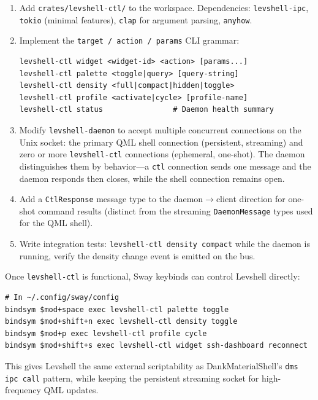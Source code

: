 \documentclass[11pt,a4paper]{article}
\begin{document}
\begin{enumerate}[leftmargin=1.5em, itemsep=2pt]
  \item Add \texttt{crates/levshell-ctl/} to the workspace. Dependencies: \texttt{levshell-ipc}, \texttt{tokio} (minimal features), \texttt{clap} for argument parsing, \texttt{anyhow}.
  \item Implement the \texttt{target / action / params} CLI grammar:
  \begin{lstlisting}[language={}]
levshell-ctl widget <widget-id> <action> [params...]
levshell-ctl palette <toggle|query> [query-string]
levshell-ctl density <full|compact|hidden|toggle>
levshell-ctl profile <activate|cycle> [profile-name]
levshell-ctl status                # Daemon health summary
  \end{lstlisting}
  \item Modify \texttt{levshell-daemon} to accept multiple concurrent connections on the Unix socket: the primary QML shell connection (persistent, streaming) and zero or more \texttt{levshell-ctl} connections (ephemeral, one-shot). The daemon distinguishes them by behavior---a \texttt{ctl} connection sends one message and the daemon responds then closes, while the shell connection remains open.
  \item Add a \texttt{CtlResponse} message type to the daemon$\to$client direction for one-shot command results (distinct from the streaming \texttt{DaemonMessage} types used for the QML shell).
  \item Write integration tests: \texttt{levshell-ctl density compact} while the daemon is running, verify the density change event is emitted on the bus.
\end{enumerate}

\begin{notebox}
Once \texttt{levshell-ctl} is functional, Sway keybinds can control Levshell directly:
\begin{lstlisting}[language={}]
# In ~/.config/sway/config
bindsym $mod+space exec levshell-ctl palette toggle
bindsym $mod+shift+n exec levshell-ctl density toggle
bindsym $mod+p exec levshell-ctl profile cycle
bindsym $mod+shift+s exec levshell-ctl widget ssh-dashboard reconnect
\end{lstlisting}
This gives Levshell the same external scriptability as DankMaterialShell's \texttt{dms ipc call} pattern, while keeping the persistent streaming socket for high-frequency QML updates.
\end{notebox}
\end{document}
